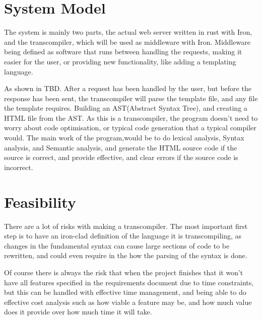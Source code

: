 \documentclass[draft]{report}
\begin{document}
\newpage

\section{System Model}
The system is mainly two parts, the actual web server written in rust with Iron, and the transcompiler, 
which will be used as middleware with Iron. Middleware being defined as software that runs between
handling the  requests, making it easier for the user, or providing new functionality, 
like adding a templating language.


As shown in TBD. After a request has been handled by the user, but before the response has been
sent, the transcompiler will parse the template file, and any file the template requires. Building an 
AST(Abstract Syntax Tree), and creating a HTML file from the AST. As this is a transcompiler,
the program doesn't need to worry about code optimisation, or typical code generation
that a typical compiler would. The main work of the program,would be to do lexical analysis,
Syntax analysis, and Semantic analysis, and generate the HTML source code if the source is correct,
and provide effective, and clear errors if the source code is incorrect.

\newpage


\section{Feasibility}
There are a lot of risks with making a transcompiler. The most important first step is to have
an iron-clad definition of the language it is transcompiling, as changes in the fundamental syntax
can cause large sections of code to be rewritten, and could even require in the how the parsing of
the syntax is done.


Of course there is always the risk that when the project finishes that it won't have all
features specified in the requirements document due to time constraints, but this can be handled with
effective time management, and being able to do effective cost analysis such as how viable a feature
may be, and how much value does it provide over how much time it will take.

\newpage

 

\end{document}

